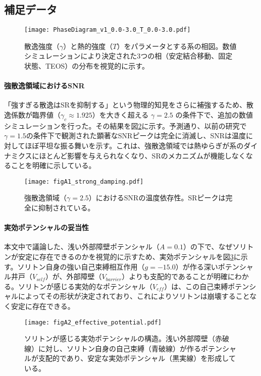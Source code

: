 \documentclass[a4paper,11pt,ja=standard,lualatex]{bxjsarticle}
\begin{document}
\subsection{補足データ}

\begin{figure}[h!]
  \centering
  \texttt{[image: PhaseDiagram\_v1\_0.0-3.0\_T\_0.0-3.0.pdf]}
  \caption{散逸強度（$\gamma$）と熱的強度（$T$）をパラメータとする系の相図。数値シミュレーションにより決定された3つの相（安定結合移動、固定状態、TEOS）の分布を視覚的に示す。}
  \label{fig:phase_diagram}
\end{figure}

\paragraph{強散逸領域におけるSNR}
「強すぎる散逸はSRを抑制する」という物理的知見をさらに補強するため、散逸係数が臨界値（$\gamma_c \approx 1.925$）を大きく超える $\gamma=2.5$ の条件下で、追加の数値シミュレーションを行った。その結果を図\ref{fig:strong_damping}に示す。予測通り、以前の研究で$\gamma=1.5$の条件下で観測された顕著なSNRピークは完全に消滅し、SNRは温度に対してほぼ平坦な振る舞いを示す。これは、強散逸領域では熱ゆらぎが系のダイナミクスにほとんど影響を与えられなくなり、SRのメカニズムが機能しなくなることを明確に示している。

\begin{figure}[h!]
  \centering
  \texttt{[image: figA1\_strong\_damping.pdf]}
  \caption{強散逸領域（$\gamma=2.5$）におけるSNRの温度依存性。SRピークは完全に抑制されている。}
  \label{fig:strong_damping}
\end{figure}

\paragraph{実効ポテンシャルの妥当性}
本文中で議論した、浅い外部障壁ポテンシャル（$A=0.1$）の下で、なぜソリトンが安定に存在できるのかを視覚的に示すため、実効ポテンシャルを図\ref{fig:effective_potential}に示す。ソリトン自身の強い自己束縛相互作用（$g=-15.0$）が作る深いポテンシャル井戸（$V_{self}$）が、外部障壁（$V_{barrier}$）よりも支配的であることが明確にわかる。ソリトンが感じる実効的なポテンシャル（$V_{eff}$）は、この自己束縛ポテンシャルによってその形状が決定されており、これによりソリトンは崩壊することなく安定に存在できる。

\begin{figure}[h!]
    \centering
    \texttt{[image: figA2\_effective\_potential.pdf]}
    \caption{ソリトンが感じる実効ポテンシャルの構造。浅い外部障壁（赤破線）に対し、ソリトン自身の自己束縛（青破線）が作るポテンシャルが支配的であり、安定な実効ポテンシャル（黒実線）を形成している。}
    \label{fig:effective_potential}
\end{figure}
\end{document}
